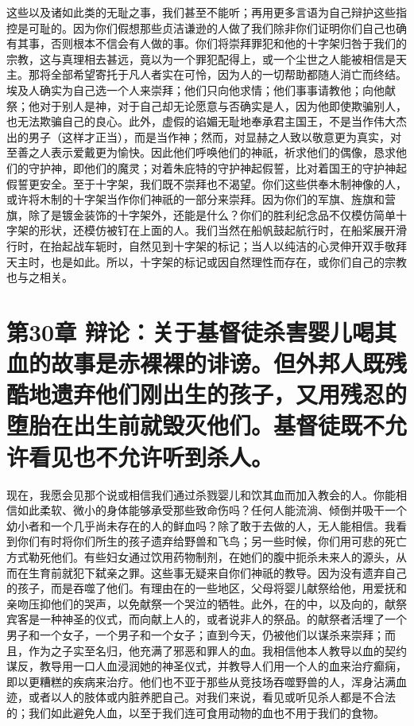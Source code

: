 这些以及诸如此类的无耻之事，我们甚至不能听；再用更多言语为自己辩护这些指控是可耻的。因为你们假想那些贞洁谦逊的人做了我们除非你们证明你们自己也确有其事，否则根本不信会有人做的事。你们将崇拜罪犯和他的十字架归咎于我们的宗教，这与真理相去甚远，竟以为一个罪犯配得上，或一个尘世之人能被相信是天主。那将全部希望寄托于凡人者实在可怜，因为人的一切帮助都随人消亡而终结。埃及人确实为自己选一个人来崇拜；他们只向他求情；他们事事请教他；向他献祭；他对于别人是神，对于自己却无论愿意与否确实是人，因为他即使欺骗别人，也无法欺骗自己的良心。此外，虚假的谄媚无耻地奉承君主国王，不是当作伟大杰出的男子（这样才正当），而是当作神；然而，对显赫之人致以敬意更为真实，对至善之人表示爱戴更为愉快。因此他们呼唤他们的神祇，祈求他们的偶像，恳求他们的守护神，即他们的魔灵；对着朱庇特的守护神起假誓，比对着国王的守护神起假誓更安全。至于十字架，我们既不崇拜也不渴望。你们这些供奉木制神像的人，或许将木制的十字架当作你们神祇的一部分来崇拜。因为你们的军旗、旌旗和营旗，除了是镀金装饰的十字架外，还能是什么？你们的胜利纪念品不仅模仿简单十字架的形状，还模仿被钉在上面的人。我们当然在船帆鼓起航行时，在船桨展开滑行时，在抬起战车轭时，自然见到十字架的标记；当人以纯洁的心灵伸开双手敬拜天主时，也是如此。所以，十字架的标记或因自然理性而存在，或你们自己的宗教也与之相关。\par


\section{第30章 辩论：关于基督徒杀害婴儿喝其血的故事是赤裸裸的诽谤。但外邦人既残酷地遗弃他们刚出生的孩子，又用残忍的堕胎在出生前就毁灭他们。基督徒既不允许看见也不允许听到杀人。}

现在，我愿会见那个说或相信我们通过杀戮婴儿和饮其血而加入教会的人。你能相信如此柔软、微小的身体能够承受那些致命伤吗？任何人能流淌、倾倒并吸干一个幼小者和一个几乎尚未存在的人的鲜血吗？除了敢于去做的人，无人能相信。我看到你们有时将你们所生的孩子遗弃给野兽和飞鸟；另一些时候，你们用可悲的死亡方式勒死他们。有些妇女通过饮用药物制剂，在她们的腹中扼杀未来人的源头，从而在生育前就犯下弑亲之罪。这些事无疑来自你们神祇的教导。因为没有遗弃自己的孩子，而是吞噬了他们。有理由在的一些地区，父母将婴儿献祭给他，用爱抚和亲吻压抑他们的哭声，以免献祭一个哭泣的牺牲。此外，在的中，以及向的，献祭宾客是一种神圣的仪式，而向献上人的，或者说非人的祭品。的献祭者活埋了一个男子和一个女子，一个男子和一个女子；直到今天，仍被他们以谋杀来崇拜；而且，作为之子实至名归，他充满了邪恶和罪人的血。我相信他本人教导以血的契约谋反，教导用一口人血浸润她的神圣仪式，并教导人们用一个人的血来治疗癫痫，即以更糟糕的疾病来治疗。他们也不亚于那些从竞技场吞噬野兽的人，浑身沾满血迹，或者以人的肢体或内脏养肥自己。对我们来说，看见或听见杀人都是不合法的；我们如此避免人血，以至于我们连可食用动物的血也不用于我们的食物。\par

